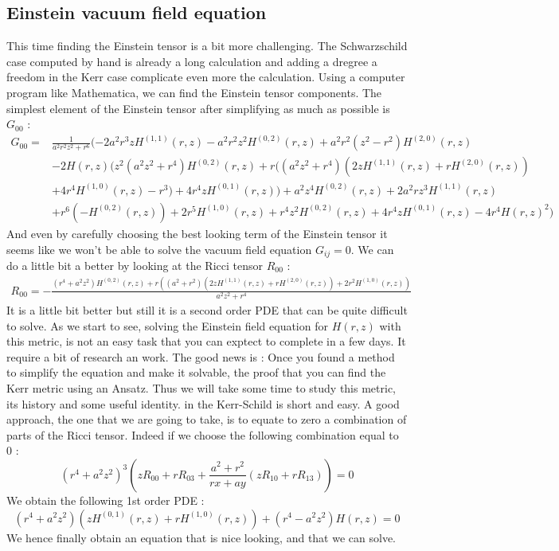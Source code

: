 \documentclass[a4paper,12pt]{article}
\theoremstyle{definition}
\begin{document}
\subsection{Einstein vacuum field equation}
This time finding the Einstein tensor is a bit more challenging.
The Schwarzschild case computed by hand is already a long calculation and adding a dregree a freedom in the Kerr case complicate even more the calculation.
Using a computer program like Mathematica, we can find the Einstein tensor components.
The simplest element of the Einstein tensor after simplifying as much as possible is $G_{00}$ :
\begin{align}
	G_{00} = &\frac{1}{a^2 r^2z^2+r^6}(-2 a^2 r^3 z H^{(1,1)}(r,z)-a^2 r^2 z^2 H^{(0,2)}(r,z)+a^2 r^2(z^2-r^2) H^{(2,0)}(r,z)\\
	&-2 H(r,z) (z^2 (a^2z^2+r^4) H^{(0,2)}(r,z)+r ((a^2 z^2+r^4)(2 z H^{(1,1)}(r,z)+r H^{(2,0)}(r,z))\\
	&+4r^4H^{(1,0)}(r,z)-r^3)+4 r^4 z H^{(0,1)}(r,z))+a^2 z^4H^{(0,2)}(r,z)+2 a^2 r z^3 H^{(1,1)}(r,z)\\
	&+r^6(-H^{(0,2)}(r,z))+2 r^5 H^{(1,0)}(r,z)+r^4 z^2H^{(0,2)}(r,z)+4 r^4 z H^{(0,1)}(r,z)-4 r^4 H(r,z)^2)
\end{align}
And even by carefully choosing the best looking term of the Einstein tensor it seems like we won't be able to solve the vacuum field equation $G_{ij}=0$.
We can do a little bit a better by looking at the Ricci tensor $R_{00}$ :
\begin{align}
	R_{00}=-\frac{(r^4+a^2z^2)H^{(0,2)}(r,z)+r
	((a^2+r^2) (2 z H^{(1,1)}(r,z)+r
	H^{(2,0)}(r,z))+2 r^2 H^{(1,0)}(r,z))}{a^2 z^2+r^4}
\end{align}
It is a little bit better but still it is a second order PDE that can be quite difficult to solve.
As we start to see, solving the Einstein field equation for $H(r,z)$ with this metric, is not an easy task that you can exptect to complete in a few days.
It require a bit of research an work.
The good news is : Once you found a method to simplify the equation and make it solvable, the proof that you can find the Kerr metric using an Ansatz.
Thus we will take some time to study this metric, its history and some useful identity. in the Kerr-Schild is short and easy.
A good approach, the one that we are going to take, is to equate to zero a combination of parts of the Ricci tensor.
Indeed if we choose the following combination equal to $0$ :
\begin{equation}
	(r^4+a^2z^2)^3(zR_{00}+rR_{03}+\frac{a^2+r^2}{rx+ay}(zR_{10}+rR_{13}))=0
\end{equation}
We obtain the following 1st order PDE :
\begin{equation}\label{Kerr:equation}
	(r^4+a^2z^2)(z H^{(0,1)}(r,z)+rH^{(1,0)}(r,z))+(r^4-a^2 z^2) H(r,z)=0
\end{equation}
We hence finally obtain an equation that is nice looking, and that we can solve.
\end{document}
